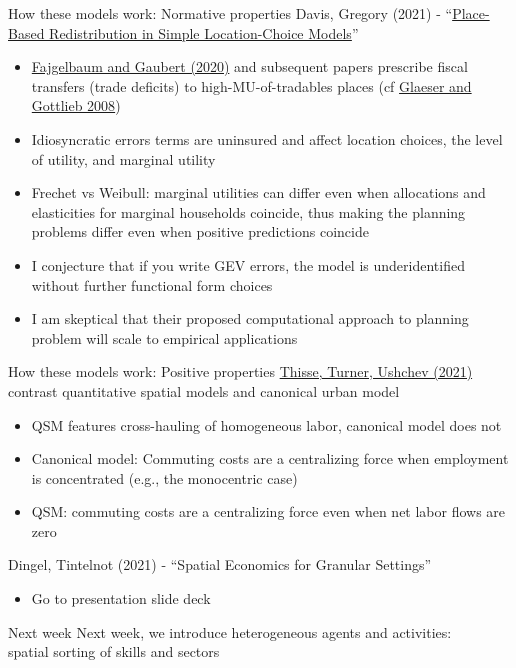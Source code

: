 \documentclass[10pt,notes=hide]{beamer}
\begin{document}
\begin{frame}{How these models work: Normative properties}
Davis, Gregory (2021) - ``\href{https://www.nber.org/papers/w29045}{Place-Based Redistribution in Simple Location-Choice Models}''
\begin{itemize}
\item
\href{https://academic.oup.com/qje/article-abstract/135/2/959/5697213}{Fajgelbaum and Gaubert (2020)} and subsequent papers
prescribe fiscal transfers (trade deficits) to high-MU-of-tradables places
(cf \href{https://www.brookings.edu/wp-content/uploads/2008/03/2008a_bpea_glaeser.pdf}{Glaeser and Gottlieb 2008})
\item
Idiosyncratic errors terms are uninsured and affect location choices, the level of utility, and marginal utility
\item 
Frechet vs Weibull:
marginal utilities can differ even when allocations and elasticities for marginal households coincide,
thus making the planning problems differ even when positive predictions coincide
\item
I conjecture that if you write GEV errors,
the model is underidentified without further functional form choices
\item
I am skeptical that their proposed computational approach to planning problem will scale to empirical applications
\end{itemize}
\end{frame}
\begin{frame}{How these models work: Positive properties}
\href{https://matthewturner.org/papers/unpublished/Thisse_Turner_Ushchev_unp_2021.pdf}{Thisse, Turner, Ushchev (2021)}
contrast quantitative spatial models and canonical urban model
\begin{itemize}
\item QSM features cross-hauling of homogeneous labor, canonical model does not
\item Canonical model: Commuting costs are a centralizing force when employment is concentrated (e.g., the monocentric case)
\item QSM: commuting costs are a centralizing force even when net labor flows are zero
\end{itemize}
Dingel, Tintelnot (2021) - ``Spatial Economics for Granular Settings''
\begin{itemize}
\item Go to presentation slide deck
\end{itemize}
\end{frame}
\begin{frame}{Next week}
Next week, we introduce heterogeneous agents and activities:\\
spatial sorting of skills and sectors
\end{frame}
\end{document}
